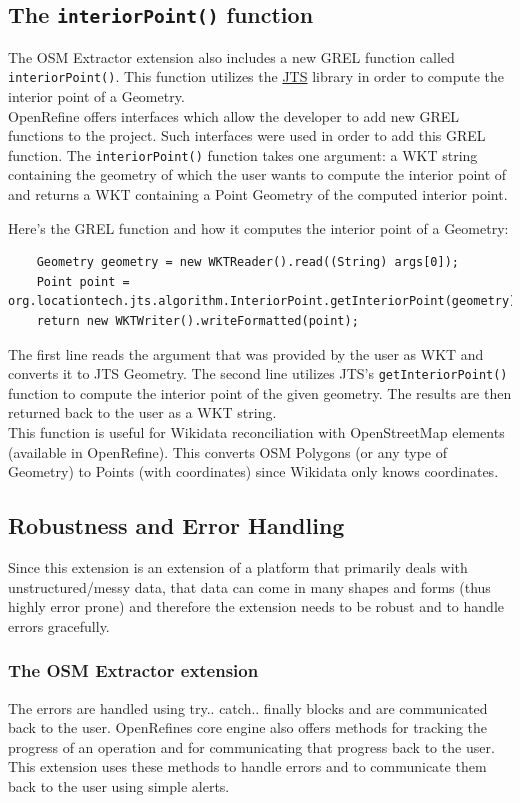 \subsection{The \texttt{interiorPoint()} function}
The OSM Extractor extension also includes a new GREL function called \texttt{interiorPoint()}. This function
utilizes the \href{https://github.com/locationtech/jts}{JTS} library in order to compute the interior point of a Geometry.\\
\newline
OpenRefine offers interfaces which allow the developer to add new GREL functions to the project. Such interfaces were used in order
to add this GREL function. The \texttt{interiorPoint()} function takes one argument: a WKT string containing the geometry
of which the user wants to compute the interior point of and returns a WKT containing a Point Geometry of the computed interior point.\\
\newline

Here's the GREL function and how it computes the interior point of a Geometry:
\begin{verbatim}
    Geometry geometry = new WKTReader().read((String) args[0]);
    Point point = org.locationtech.jts.algorithm.InteriorPoint.getInteriorPoint(geometry);
    return new WKTWriter().writeFormatted(point);
\end{verbatim}
The first line reads the argument that was provided by the user as WKT and converts it to JTS Geometry.
The second line utilizes JTS's \texttt{getInteriorPoint()} function to compute the interior point of the
given geometry. The results are then returned back to the user as a WKT string.\\
\newline
This function is useful for Wikidata reconciliation with OpenStreetMap elements (available in OpenRefine).
This converts OSM Polygons (or any type of Geometry) to Points (with coordinates) since Wikidata only knows coordinates.
\pagebreak
\subsection{Robustness and Error Handling}
Since this extension is an extension of a platform that primarily deals with unstructured/messy data, that data can come in many shapes and forms (thus highly error prone) and therefore the extension needs to be robust and to handle errors gracefully.
\subsubsection{The OSM Extractor extension}
The errors are handled using try.. catch.. finally blocks and are communicated back to the user. OpenRefine\textquotesingle s core engine also offers methods for tracking the progress of an operation and for communicating that progress back to the user. This extension uses these methods to handle errors and to communicate them back to the user using simple alerts.

